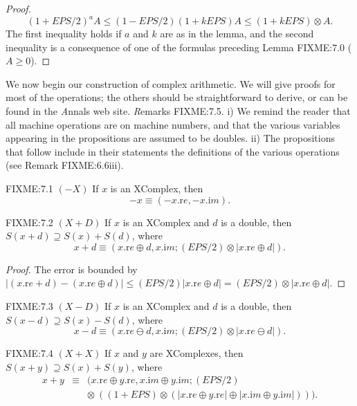 \begin{definition}
\begin{proof}{} 
$$(1 + EPS/2)^a A\le (1 - EPS/2)(1 + k EPS) A \le (1 + k EPS) \otimes A.$$ 
The first inequality holds if $a$ and $k$ are as in the lemma, and the second inequality is a consequence of one of the
formulas preceding Lemma FIXME:7.0 ($A \ge 0$). \end{proof}
 
We now begin our construction of complex arithmetic. We will give proofs for most of the operations; the others should be straightforward to derive,
or can be found in the {\textit Annals} web site.
{\textit Remarks} FIXME:7.5.
i) We remind the reader that all machine operations are on machine numbers, and that the various variables appearing in the propositions are assumed to be doubles.
ii) The propositions that follow include in their statements the definitions of the various operations (see Remark FIXME:6.6iii).

\begin{proposition}{FIXME:7.1 {$(-X)$}} 
If $x$ is an {\textrm XComplex,} then 
$$-x \equiv (-x.{\mathrm re},-x.{\mathrm im}).$$ 
\end{proposition}

\begin{proposition}{FIXME:7.2 {$(X + D)$}} 
If $x$ is an {\textrm XComplex} and $d$ is a double{\textrm ,} then 
$S(x + d) \supseteq S(x) + S(d)${\textrm ,} where 
 $$x + d \equiv (x.{\mathrm re} \oplus d, x.{\mathrm im};
(EPS/2)\otimes |x.{\mathrm re} \oplus d|).$$
\end{proposition}

\begin{proof}{}
The  error is bounded by  
\hfill ${\displaystyle |(x.{\mathrm re} + d) - (x.{\mathrm re} \oplus d)|
\le (EPS/2) | x.{\mathrm re} \oplus d|
  =  (EPS/2) \otimes | x.{\mathrm re} \oplus d|.}$ \end{proof}

\begin{proposition}{FIXME:7.3 {$(X - D)$}} 
If $x$ is an {\textrm XComplex} and $d$ is a double{\textrm ,} then 
$S(x - d) \supseteq S(x) - S(d)${\textrm ,} where 
 $$x - d \equiv (x.{\mathrm re} \ominus d, x.{\mathrm im};
(EPS/2)\otimes |x.{\mathrm re} \ominus d|).$$ \end{proposition}

\begin{proposition}{FIXME:7.4 {$(X + X)$}} 
If $x$ and $y$ are {\textrm XComplexes,} then 
$S(x + y) \supseteq S(x) + S(y)${\textrm ,} where
 \begin{eqnarray*}
x + y &\equiv& (x.{\mathrm re} \oplus y.{\mathrm re}, x.{\mathrm im} \oplus y.{\mathrm im};
(EPS/2)\\
&&  \otimes\ ((1 + EPS)  \otimes (|x.{\mathrm re} \oplus y.{\mathrm re}| \oplus |x.{\mathrm im} \oplus y.{\mathrm im}|))).
\end{eqnarray*}
\end{proposition}
  


\end{definition}

